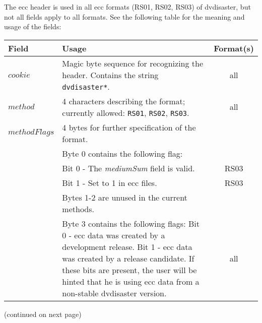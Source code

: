\bigskip

The ecc header is used in all ecc formats (RS01, RS02, RS03) of dvdisaster,
but not all fields apply to all formats. See the following table for the meaning
and usage of the fields:
\bigskip

\begin{tabular}{|l|p{10cm}|c|}
\hline
Field & Usage & Format(s) \\
\hline
$cookie$ & Magic byte sequence for recognizing the header.\newline
Contains the string {\tt *dvdisaster*}. & all \\
\hline
$method$ & 4 characters describing the format; currently allowed:\newline
{\tt RS01}, {\tt RS02}, {\tt RS03}. & all \\ 
\hline
$methodFlags$ & 4 bytes for further specification of the format. &\\
 \cline{2-3} 
 & Byte 0 contains the following flag: &\\
 & Bit 0 - The {\em mediumSum} field is valid. & RS03 \\
 & Bit 1 - Set to 1 in ecc files. & RS03 \\
 \cline{2-3} 
 & Bytes 1-2 are unused in the current methods. & \\
 \cline{2-3} 
 & Byte 3 contains the following flags:\newline
Bit 0 - ecc data was created by a development release.\newline
Bit 1 - ecc data was created by a release candidate.\newline
If these bits are present, the user will be hinted that he is using
ecc data from a non-stable dvdisaster version. & all \\
\hline
\end{tabular}

{\footnotesize (continued on next page)}
\vfill
\newpage

